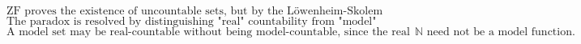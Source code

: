 $$
\text{ZF proves the existence of uncountable sets, but by the L\"owenheim-Skolem Theorem, ZF has a countable model.}
$$
$$
\text{The paradox is resolved by distinguishing "real" countability from "model" countability.}
$$
$$
\text{A model set may be real-countable without being model-countable, since the real bijection with } \mathbb{N} \text{ need not be a model function.}
$$

